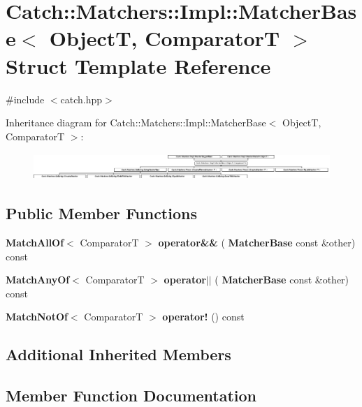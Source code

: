 \section{Catch\+:\+:Matchers\+:\+:Impl\+:\+:Matcher\+Base$<$ ObjectT, ComparatorT $>$ Struct Template Reference}
\label{struct_catch_1_1_matchers_1_1_impl_1_1_matcher_base}


{\ttfamily \#include $<$catch.\+hpp$>$}

Inheritance diagram for Catch\+:\+:Matchers\+:\+:Impl\+:\+:Matcher\+Base$<$ ObjectT, ComparatorT $>$\+:\begin{figure}[H]
\begin{center}
\leavevmode
\includegraphics[height=1.006289cm]{struct_catch_1_1_matchers_1_1_impl_1_1_matcher_base}
\end{center}
\end{figure}
\subsection*{Public Member Functions}
\begin{DoxyCompactItemize}
\item 
\textbf{ Match\+All\+Of}$<$ ComparatorT $>$ \textbf{ operator\&\&} (\textbf{ Matcher\+Base} const \&other) const
\item 
\textbf{ Match\+Any\+Of}$<$ ComparatorT $>$ \textbf{ operator$\vert$$\vert$} (\textbf{ Matcher\+Base} const \&other) const
\item 
\textbf{ Match\+Not\+Of}$<$ ComparatorT $>$ \textbf{ operator!} () const
\end{DoxyCompactItemize}
\subsection*{Additional Inherited Members}


\subsection{Member Function Documentation}
\mbox{\label{struct_catch_1_1_matchers_1_1_impl_1_1_matcher_base_a85174b5b27113f7bdc47c140c1c72602}} 
